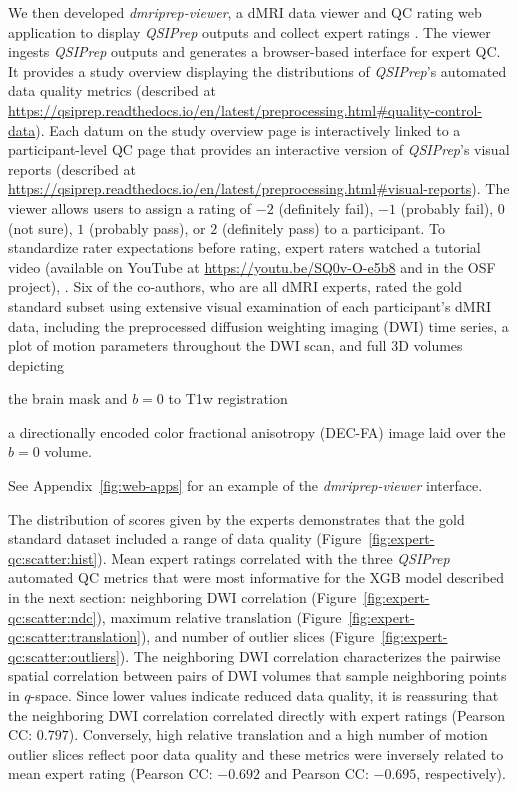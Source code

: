 \documentclass[fleqn,10pt,inline]{wlscirep}
\begin{document}
We then developed \emph{dmriprep-viewer},
a dMRI data viewer and QC rating web application to display \emph{QSIPrep}
outputs and collect expert ratings \cite{richie-halford2022-viewer}.
The viewer
ingests \emph{QSIPrep} outputs and generates a browser-based interface for
expert QC. It provides a study overview displaying the distributions of
\emph{QSIPrep}'s automated data quality metrics (described at
\url{https://qsiprep.readthedocs.io/en/latest/preprocessing.html#quality-control-data}).
Each datum on the study overview page is interactively linked to a participant-level
QC page that provides an interactive version of \emph{QSIPrep}'s visual reports
(described at
\url{https://qsiprep.readthedocs.io/en/latest/preprocessing.html#visual-reports}).
The viewer allows users to assign a rating of $-2$ (definitely fail), $-1$
(probably fail), $0$ (not sure), $1$ (probably pass), or $2$ (definitely pass) to a
participant.
To standardize rater expectations before rating, expert raters watched
a tutorial video (available on YouTube at \url{https://youtu.be/SQ0v-O-e5b8} and in the OSF project), .
Six of the
co-authors, who are all dMRI experts, rated the gold standard subset
using extensive visual examination of each participant's dMRI data,
including the preprocessed diffusion weighting imaging (DWI) time series, a plot of
motion parameters throughout the DWI scan, and full 3D volumes depicting
\begin{enumerate*}[%
    label=(\roman*),%
    before={{ }},%
    itemjoin={{, }},%
    itemjoin*={{ and }}]
    \item the brain mask and $b=0$ to T1w registration
    \item a directionally encoded color fractional anisotropy (DEC-FA) image laid over the $b=0$ volume.
\end{enumerate*}
See Appendix~\ref{fig:web-apps} for an example of the \emph{dmriprep-viewer} interface.

The distribution of scores given by the experts demonstrates that the
gold standard dataset included a range of data quality (Figure~\ref{fig:expert-qc:scatter:hist}). Mean expert ratings
correlated with the three \emph{QSIPrep} automated QC metrics that were most informative for the XGB model described in the next section:
neighboring DWI correlation \cite{yeh2019-kb} (Figure~\ref{fig:expert-qc:scatter:ndc}), maximum relative
translation (Figure~\ref{fig:expert-qc:scatter:translation}), and number of outlier slices (Figure~\ref{fig:expert-qc:scatter:outliers}). The neighboring DWI correlation characterizes
the pairwise spatial correlation between pairs of DWI volumes that sample
neighboring points in $q$-space. Since lower values indicate reduced data
quality, it is reassuring that the neighboring DWI correlation correlated directly with expert ratings
(Pearson CC: $0.797$). Conversely, high relative translation and a high number of
motion outlier slices reflect poor data quality and these metrics were inversely
related to mean expert rating (Pearson CC: $-0.692$ and Pearson CC: $-0.695$,
respectively).
\end{document}
